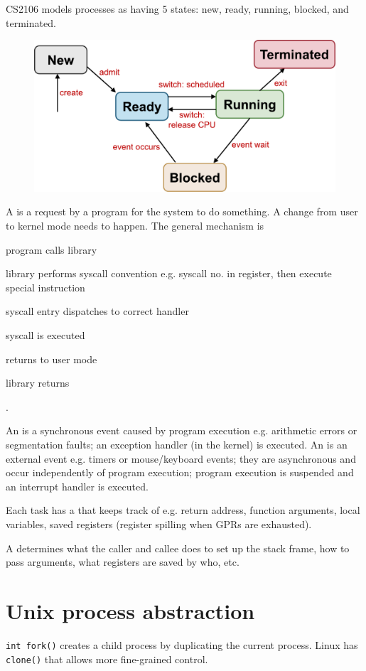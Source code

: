 \documentclass[fontsize=9pt,twoside]{slnotes}
\begin{document}
CS2106 models processes as having 5 states: new, ready, running, blocked, and terminated.

\begin{figure}
\includegraphics[width=0.5\columnwidth]{pstates.pdf}
\end{figure}

A  is a request by a program for the system to do something. A change from user to kernel mode needs to happen. The general mechanism is \begin{slinenum}
\item program calls library
\item library performs syscall convention e.g. syscall no. in register, then execute special instruction
\item syscall entry dispatches to correct handler
\item syscall is executed
\item returns to user mode
\item library returns
\end{slinenum}.

An  is a synchronous event caused by program execution e.g. arithmetic errors or segmentation faults; an exception handler (in the kernel) is executed. An  is an external event e.g. timers or mouse/keyboard events; they are asynchronous and occur independently of program execution; program execution is suspended and an interrupt handler is executed.

Each task has a  that keeps track of e.g. return address, function arguments, local variables, saved registers (register spilling when GPRs are exhausted).

A  determines what the caller and callee does to set up the stack frame, how to pass arguments, what registers are saved by who, etc.

\section{Unix process abstraction}
\texttt{int fork()} creates a child process by duplicating the current process. Linux has \texttt{clone()} that allows more fine-grained control.
\end{document}
